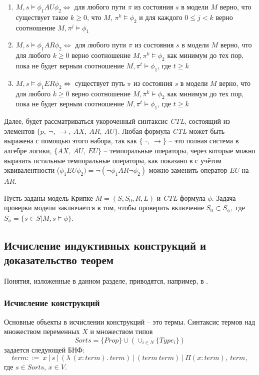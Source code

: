 \documentclass[12pt]{article}
\begin{document}
\begin{enumerate}
    \item $M, s \vDash \phi_1 AU \phi_2 \Leftrightarrow$ для любого пути $\pi$ из состояния $s$ в модели $M$ верно, что существует такое $k \geq 0$, что $M$, $\pi^{k} \vDash \phi_2$ и для каждого $0 \leq j < k$ верно соотношение $M, \pi^{j} \vDash \phi_1$

    \item $M, s \vDash \phi_1 AR \phi_2 \Leftrightarrow$ для любого пути $\pi$ из состояния $s$ в модели $M$ верно, что для любого $k \geq 0$ верно соотношение $M, \pi^{k} \vDash \phi_2$ как минимум до тех пор, пока не будет верным соотношение $M, \pi^{t} \vDash \phi_1$, где $t \geq k$

    \item $M, s \vDash \phi_1 ER \phi_2 \Leftrightarrow$ существует путь $\pi$ из состояния $s$ в модели $M$ верно, что для любого $k \geq 0$ верно соотношение $M, \pi^{k} \vDash \phi_2$ как минимум до тех пор, пока не будет верным соотношение $M, \pi^{t} \vDash \phi_1$, где $t \geq k$
    
\end{enumerate}

Далее, будет рассматриваться укороченный синтаксис \textit{CTL}, состоящий из элементов $\{p,\ \neg,\ \xrightarrow{},\ AX,\ AR,\ AU\}$. Любая формула \textit{CTL} может быть выражена с помощью этого набора, так как $\{\neg,\ \xrightarrow{}\}$ -- это полная система в алгебре логики, $\{AX,\ AU,\ EU\}$ -- темпоральные операторы, через которые можно выразить остальные темпоральные операторы, как показано в \cite{Karpov} с учётом эквивалентности  ($\phi_1EU\phi_2)= \neg(\neg\phi_1AR\neg\phi_2)$ можно заменить оператор $EU$ на $AR$.


Пусть заданы модель Крипке $M = (S, S_0, R, L)$ и \textit{CTL}-формула $\phi$. Задача проверки модели заключается в том, чтобы проверить включение $S_0 \subset S_{\phi},$ где $S_{\phi} = \{s \in S | M,s \vDash \phi \}$. 


\subsection{Исчисление индуктивных конструкций и доказательство теорем}

Понятия, изложенные в данном разделе, приводятся, например, в \cite{CIC}\cite{Coquand}\cite{CHC}\cite{CHCCOQ}.

\subsubsection{Исчисление конструкций}
Основные объекты в исчислении конструкций -- это термы.
Синтаксис термов над множеством переменных $X$ 
и множеством типов 
$$Sorts=\{Prop\} \cup (\cup_{i \in N} \{Type_i\})$$
задается следующей БНФ:
$$term ::=\ x\ |\ s\ |\ (\lambda\ (x : term).\ term)\ |\ (term\ term)\ |\ \Pi (x:term),\ term,$$ 
где $s \in Sorts$, $x \in V$.
\end{document}
